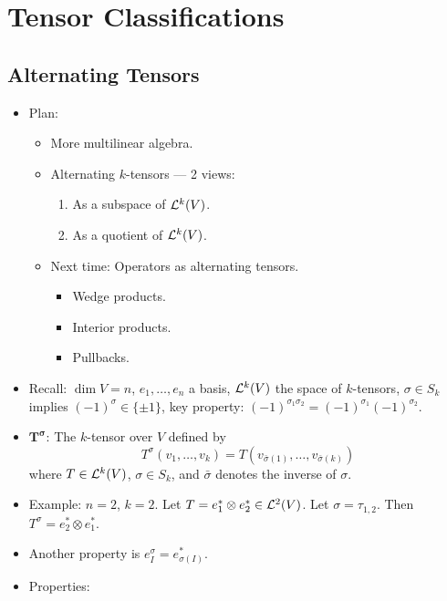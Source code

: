 \documentclass[../notes.tex]{subfiles}
\begin{document}
\chapter{Tensor Classifications}
\section{Alternating Tensors}
\begin{itemize}
    \item {}Plan:
    \begin{itemize}
        \item More multilinear algebra.
        \item Alternating $k$-tensors --- 2 views:
        \begin{enumerate}
            \item As a subspace of $\lin[k]{V}$.
            \item As a quotient of $\lin[k]{V}$.
        \end{enumerate}
        \item Next time: Operators as alternating tensors.
        \begin{itemize}
            \item Wedge products.
            \item Interior products.
            \item Pullbacks.
        \end{itemize}
    \end{itemize}
    \item Recall: $\dim V=n$, $e_1,\dots,e_n$ a basis, $\lin[k]{V}$ the space of $k$-tensors, $\sigma\in S_k$ implies $(-1)^\sigma\in\{\pm 1\}$, key property: $(-1)^{\sigma_1\sigma_2}=(-1)^{\sigma_1}(-1)^{\sigma_2}$.
    \item $\bm{T^\sigma}$: The $k$-tensor over $V$ defined by
    \begin{equation*}
        T^\sigma(v_1,\dots,v_k) = T(v_{\bar{\sigma}(1)},\dots,v_{\bar{\sigma}(k)})
    \end{equation*}
    where $T\in\lin[k]{V}$, $\sigma\in S_k$, and $\bar{\sigma}$ denotes the inverse of $\sigma$.
    \item Example: $n=2$, $k=2$. Let $T=e_1^*\otimes e_2^*\in\lin[2]{V}$. Let $\sigma=\tau_{1,2}$. Then $T^\sigma=e_2^*\otimes e_1^*$.
    \item Another property is $e_I^\sigma=e_{\sigma(I)}^*$.
    \item Properties:
    \begin{enumerate}

\end{enumerate}
\end{itemize}
\end{document}

